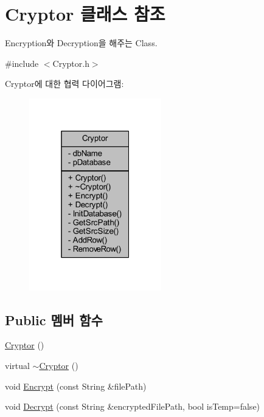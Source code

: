\hypertarget{class_cryptor}{\section{Cryptor 클래스 참조}
\label{class_cryptor}
}


Encryption와 Decryption을 해주는 Class.  




{\ttfamily \#include $<$Cryptor.\+h$>$}



Cryptor에 대한 협력 다이어그램\+:
\nopagebreak
\begin{figure}[H]
\begin{center}
\leavevmode
\includegraphics[width=163pt]{class_cryptor__coll__graph}
\end{center}
\end{figure}
\subsection*{Public 멤버 함수}
\begin{DoxyCompactItemize}
\item 
\hyperlink{class_cryptor_a85f7a641e179ac55a461dd5cbba855cb}{Cryptor} ()
\item 
virtual \hyperlink{class_cryptor_af7753ec797d11b5ef418225cca325f4b}{$\sim$\+Cryptor} ()
\item 
void \hyperlink{class_cryptor_adfd6b30e2859df0dc7136ae3d90ddb31}{Encrypt} (const String \&file\+Path)
\item 
void \hyperlink{class_cryptor_a82e76152a3351f63ae517664187d5498}{Decrypt} (const String \&encrypted\+File\+Path, bool is\+Temp=false)
\end{DoxyCompactItemize}
